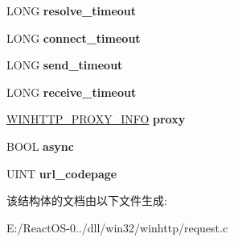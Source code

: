 \begin{DoxyCompactItemize}
\mbox{\label{structwinhttp__request_a6eb7e10a536d3cd95cd253f988458b38}} 
L\+O\+NG {\bfseries resolve\+\_\+timeout}
\item 
\mbox{\label{structwinhttp__request_ac3b3d82f5d668fbe7933a0a3930ac7a2}} 
L\+O\+NG {\bfseries connect\+\_\+timeout}
\item 
\mbox{\label{structwinhttp__request_a41f9668682eaf096fe2b3e525a829a7b}} 
L\+O\+NG {\bfseries send\+\_\+timeout}
\item 
\mbox{\label{structwinhttp__request_a5f9f49f5f8abcefe5d33d4d7083f7228}} 
L\+O\+NG {\bfseries receive\+\_\+timeout}
\item 
\mbox{\label{structwinhttp__request_af40c36a2f17bd31711fe9b49a2db736f}} 
\hyperlink{struct_w_i_n_h_t_t_p___p_r_o_x_y___i_n_f_o}{W\+I\+N\+H\+T\+T\+P\+\_\+\+P\+R\+O\+X\+Y\+\_\+\+I\+N\+FO} {\bfseries proxy}
\item 
\mbox{\label{structwinhttp__request_a1e3029becea21ce5bc39e553ca4b8fa4}} 
B\+O\+OL {\bfseries async}
\item 
\mbox{\label{structwinhttp__request_af5a70e1e0d54acffe9b2cb393f4b572c}} 
U\+I\+NT {\bfseries url\+\_\+codepage}
\end{DoxyCompactItemize}


该结构体的文档由以下文件生成\+:\begin{DoxyCompactItemize}
\item 
E\+:/\+React\+O\+S-\/0../dll/win32/winhttp/request.\+c\end{DoxyCompactItemize}
